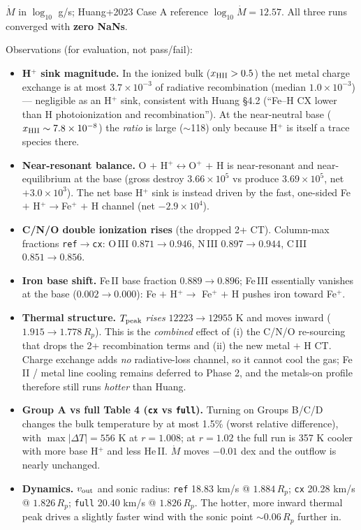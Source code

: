 \documentclass[english,a4paper]{kiseon_memo}
\begin{document}
$\dot M$ in $\log_{10}$ g/s; Huang+2023 Case A reference
$\log_{10}\dot M = 12.57$. All three runs converged with \textbf{zero NaNs}.

Observations (for evaluation, not pass/fail):
\begin{itemize}
\item \textbf{H$^+$ sink magnitude.} In the ionized bulk ($x_{\rm HII}>0.5$) the
  net metal charge exchange is at most $3.7\times10^{-3}$ of radiative
  recombination (median $1.0\times10^{-3}$) --- negligible as an H$^+$ sink,
  consistent with Huang \S4.2 (``Fe--H CX lower than H photoionization and
  recombination''). At the near-neutral base ($x_{\rm HII}\sim7.8\times10^{-8}$)
  the \emph{ratio} is large ($\sim$118) only because H$^+$ is itself a trace
  species there.
\item \textbf{Near-resonant balance.} O $+$ H$^+\!\leftrightarrow$O$^+$ $+$ H is
  near-resonant and near-equilibrium at the base (gross destroy $3.66\times10^5$
  vs produce $3.69\times10^5$, net $+3.0\times10^3$). The net base H$^+$ sink is
  instead driven by the fast, one-sided Fe $+$ H$^+\!\rightarrow$Fe$^+$ $+$ H
  channel (net $-2.9\times10^4$).
\item \textbf{C/N/O double ionization rises} (the dropped 2+ CT). Column-max
  fractions \texttt{ref}$\to$\texttt{cx}: O\,III $0.871\to0.946$,
  N\,III $0.897\to0.944$, C\,III $0.851\to0.856$.
\item \textbf{Iron base shift.} Fe\,II base fraction $0.889\to0.896$; Fe\,III
  essentially vanishes at the base ($0.002\to0.000$): Fe $+$ H$^+\!\rightarrow$%
  Fe$^+$ $+$ H pushes iron toward Fe$^+$.
\item \textbf{Thermal structure.} $T_{\rm peak}$ \emph{rises} $12223\to12955$ K
  and moves inward ($1.915\to1.778\,R_p$). This is the \emph{combined} effect of
  (i) the C/N/O re-sourcing that drops the 2+ recombination terms and (ii) the new
  metal $+$ H CT. Charge exchange adds \emph{no} radiative-loss channel, so it
  cannot cool the gas; Fe\,II / metal line cooling remains deferred to Phase 2,
  and the metals-on profile therefore still runs \emph{hotter} than Huang.
\item \textbf{Group A vs full Table 4 (\texttt{cx} vs \texttt{full}).} Turning on
  Groups B/C/D changes the bulk temperature by at most 1.5\% (worst relative
  difference), with $\max|\Delta T| = 556$ K at $r=1.008$; at $r=1.02$ the full
  run is 357 K cooler with more base H$^+$ and less He\,II. $\dot M$ moves
  $-0.01$ dex and the outflow is nearly unchanged.
\item \textbf{Dynamics.} $v_{\rm out}$ and sonic radius: \texttt{ref}
  18.83 km/s @ $1.884\,R_p$; \texttt{cx} 20.28 km/s @ $1.826\,R_p$;
  \texttt{full} 20.40 km/s @ $1.826\,R_p$. The hotter, more inward thermal peak
  drives a slightly faster wind with the sonic point $\sim0.06\,R_p$ further in.
\end{itemize}
\end{document}
